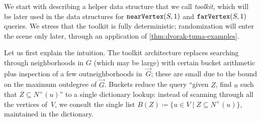 
We start with describing a helper data structure that we call \emph{toolkit}, which will be later used in the data structures for $\mathtt{nearVertex}(S,1)$ and $\mathtt{farVertex}(S,1)$ queries. We stress that the toolkit is fully deterministic; randomization will enter the scene only later, through an application of \cref{thm:dvorak-tuma-examples}.


Let us first explain the intuition.
The toolkit architecture replaces searching through neighborhoods in $G$ (which may be large) with certain bucket arithmetic plus inspection of a few outneighborhoods in~$\vec G$; these are small due to the bound on the maximum outdegree of $\vec G$.  %
Buckets reduce the query ``given $Z$, find $u$ such that $Z\subseteq N^+(u)$'' to a single dictionary lookup: instead of scanning through all the vertices of~$V$, we consult the single list $B(Z)\coloneqq \{u\in V \mid Z\subseteq N^+(u)\}$, maintained in the dictionary.

